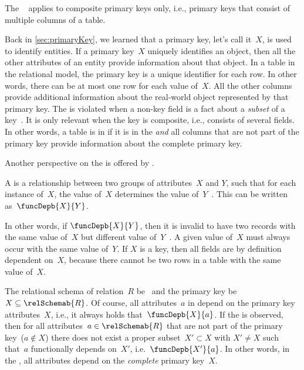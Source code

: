 %
\label{sec:normalForm:2}%
%
The ~\cite{C1971FNOTDBRM,C1971NDBSABT,K1983ASGTFNFIRDT,D2003AITDS,EN2015FODS} applies to composite primary keys only, i.e., primary keys that consist of multiple columns of a table.

Back in \cref{sec:primaryKey}, we learned that a primary key, let's call it~$X$, is used to identify entities.
If a primary key~$X$ uniquely identifies an object, then all the other attributes of an entity provide information about that object.
In a table in the relational model, the primary key is a unique identifier for each row.
In other words, there can be at most one row for each value of~$X$.
All the other columns provide additional information about the real-world object represented by that primary key.
The  is violated when a non-key field is a fact about a \emph{subset} of a key~\cite{K1983ASGTFNFIRDT}.
It is only relevant when the key is composite, i.e., consists of several fields.
In other words, a table is in  if it is in the  \emph{and} all columns that are not part of the primary key provide information about the complete primary key.

Another perspective on the  is offered by .%
%
\begin{definition}%
\label{def:functionalDependency}%
A \emph{} is a relationship between two groups of attributes~$X$ and $Y$, such that for each instance of~$X$, the value of~$X$ determines the value of~$Y$~\cite{S2024D:RNDAFDNF}. %
This can be written as~$\funcDepb{X}{Y}$.%
\end{definition}%
%
In other words, if $\funcDepb{X}{Y}$, then it is invalid to have two records with the same value of~$X$ but different value of~$Y$~\cite{K1983ASGTFNFIRDT}.
A given value of~$X$ must always occur with the same value of~$Y$.
If $X$ is a key, then all fields are by definition dependent on~$X$, because there cannot be two rows in a table with the same value of~$X$.

The relational schema of relation~$R$ be~ and the primary key be~$X\subseteq\relSchemab{R}$.
Of course, all attributes~$a$ in depend on the primary key attributes~$X$, i.e., it always holds that~$\funcDepb{X}{a}$.
If the  is observed, then for all attributes~$a\in\relSchemab{R}$ that are not part of the primary key~($a \not\in X$) there does not exist a proper subset~$X'\subset X$ with $X'\neq X$ such that~$a$ functionally depends on~$X'$, i.e.~$\funcDepb{X'}{a}$.
In other words, in the , all attributes depend on the \emph{complete} primary key~$X$.%
%
%
%
%
\endhsection%
%
